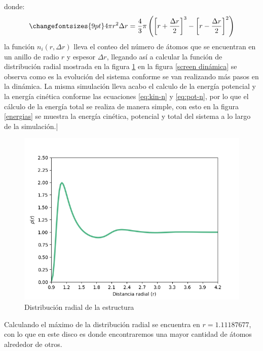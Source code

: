 \documentclass[reprint,amsmath,amssymb,aps,]{revtex4-2}
\begin{document}
donde:
\begin{equation}
    \changefontsizes{9pt}
    \label{eq:volumen}
   4 \pi r^2 \Delta r =\frac{4}{3} \pi \left(\left[r +\frac{\Delta r}{2}\right]^3 - \left[r- \frac{\Delta r}{2} \right]^2 \right)
\end{equation}
la función $n_i(r,\Delta r)$ lleva el conteo del número de átomos que se encuentran en un anillo de radio $r$ y espesor $\Delta r$, llegando así a calcular la función de distribución radial mostrada en la figura \ref{distribución radial}
en la figura \ref{screen dinámica} se observa como es la evolución del sistema conforme se van realizando más pasos en la dinámica. 
La misma simulación lleva acabo el calculo de la energía potencial y la energía cinética conforme las ecuaciones \ref{eq:kin-n} y \ref{eq:pot-n}, por lo que el cálculo de la energía total se realiza de manera simple, con esto en la figura \ref{energias} se muestra la energía cinética, potencial y total del sistema a lo largo de la simulación.|
\begin{figure}[H]
    \centering
    \includegraphics[scale=0.48]{../Graphics/Dis_rad.png}
    \caption{Distribución radial de la estructura}
    \label{distribución radial}
\end{figure}
Calculando el máximo de la distribución radial se encuentra en $r=1.11187677$, con lo que en este disco es donde encontraremos una mayor cantidad de átomos alrededor de otros.
\end{document}
